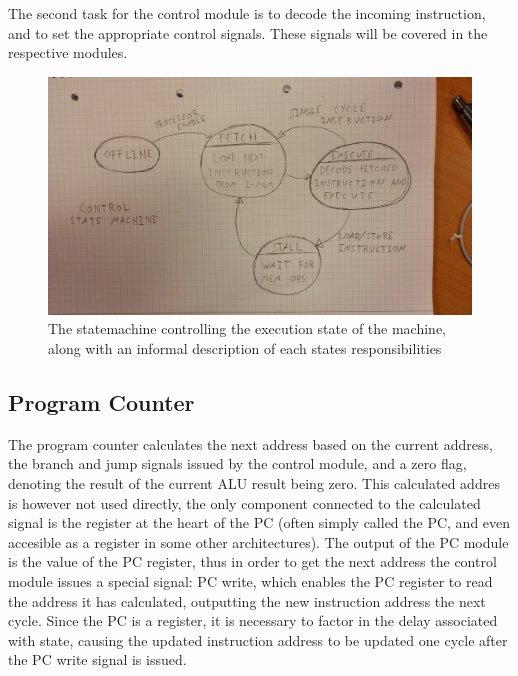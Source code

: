 The second task for the control module is to decode the incoming instruction, and to set the appropriate control signals. These signals will be covered in the respective modules.

\begin{figure}[h!]
    \includegraphics[width=\linewidth]{img/FSM.jpg}
    \caption{The statemachine controlling the execution state of the machine, along with an informal description of each states responsibilities}
    \label{fig:States}
\end{figure}

\subsection{Program Counter}

The program counter calculates the next address based on the current address, the branch and jump signals issued by the control module, and a zero flag, denoting the result of the current ALU result being zero.
This calculated addres is however not used directly, the only component connected to the calculated signal is the register at the heart of the PC (often simply called the PC, and even accesible as a register in some other architectures).
The output of the PC module is the value of the PC register, thus in order to get the next address the control module issues a special signal: PC write, which enables the PC register to read the address it has calculated, outputting the new instruction address the next cycle.
Since the PC is a register, it is necessary to factor in the delay associated with state, causing the updated instruction address to be updated one cycle after the PC write signal is issued.

